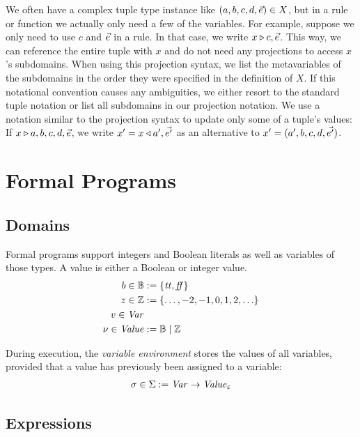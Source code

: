 \documentclass[a4paper,10pt,english]{article}
\begin{document}
	We often have a complex tuple type instance like $(a, b, c, d, \vec{e}) \in X$, but in a rule or
	function we actually only need a few of the variables. For example, suppose we only need to use $c$ and $\vec{e}$ in a rule. In that case,
	we write $x \triangleright c, \vec{e}$.
	This way, we can reference the entire tuple with $x$ and do not need any projections to access $x$'s subdomains. When using this projection syntax, we list the
	metavariables of the subdomains in the order they were specified in the definition of $X$. If this notational convention causes any ambiguities, we either
	resort to the standard tuple notation or list all subdomains in our projection notation. We use a notation similar to the
	projection syntax to update only some of a tuple's values: If $x \triangleright a, b, c, d, \vec{e}$, we write $x' = x
	\triangleleft a', \vec{e'}$ as an alternative to $x' = (a', b, c, d, \vec{e'})$.  

\section{Formal Programs}

\subsection{Domains}

Formal programs support integers and Boolean literals as well as variables of those types. A value is either a Boolean or integer
value.
\begin{align*}
    b \in \mathbb{B} &:= \{ \mathit{tt}, \mathit{ff} \}
    \\
    z \in \mathbb{Z} &:= \{ \ldots, -2, -1, 0, 1, 2, \ldots \}
    \\
    v \in \mathit{Var}
    \\
    \nu \in \mathit{Value} &:= \mathbb{B} \mid \mathbb{Z}
\end{align*}

During execution, the \textit{variable environment} stores the values of all variables, provided that a value has previously been
assigned to a variable:
\begin{align*}
	\sigma \in \Sigma := \mathit{Var} \rightarrow \mathit{Value}_\varepsilon
\end{align*}

\subsection{Expressions}
\end{document}
